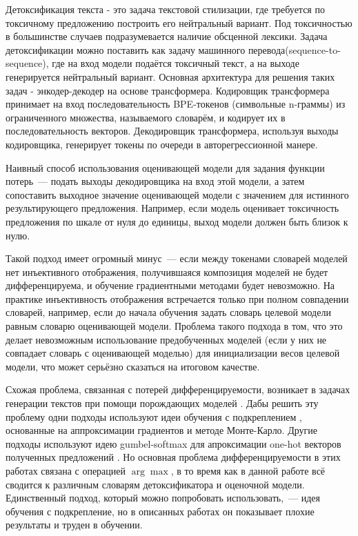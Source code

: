 Детоксификация текста - это задача текстовой стилизации, где требуется по токсичному предложению построить его нейтральный вариант.
Под токсичностью в большинстве случаев подразумевается наличие обсценной лексики.
Задача детоксификации можно поставить как задачу машинного перевода(sequence-to-sequence), где на вход модели подаётся токсичный текст, а на выходе генерируется нейтральный вариант. 
Основная архитектура для решения таких задач - энкодер-декодер на основе трансформера\cite{t5}. 
Кодировщик трансформера принимает на вход последовательность BPE-токенов (символьные n-граммы) из ограниченного множества, называемого словарём, и кодирует их в последовательность векторов. 
Декодировщик трансформера, используя выходы кодировщика, генерирует токены по очереди в авторегрессионной манере.

Наивный способ использования оценивающей модели для задания функции потерь~--- подать выходы декодировщика на вход этой модели, а затем сопоставить выходное значение оценивающей модели с значением для истинного результирующего предложения. 
Например, если модель оценивает токсичность предложения по шкале от нуля до единицы, выход модели должен быть близок к нулю.

Такой подход имеет огромный минус~--- если между токенами словарей моделей нет инъективного отображения, получившаяся композиция моделей не будет дифференцируема, и обучение градиентными методами будет невозможно. 
На практике инъективность отображения встречается только при полном совпадении словарей, например, если до начала обучения задать словарь целевой модели равным словарю оценивающей модели. 
Проблема такого подхода в том, что это делает невозможным использование предобученных моделей (если у них не совпадает словарь с оценивающей моделью) для инициализации весов целевой модели, что может серьёзно сказаться на итоговом качестве.

Схожая проблема, связанная с потерей дифференцируемости, возникает в задачах генерации текстов при помощи порождающих моделей \cite{gan-bert, gan-wo-rl}.
Дабы решить эту проблему одни подходы используют идеи обучения с подкреплением \cite{Yu_Zhang_Wang_Yu_2017}, основанные на аппроксимации градиентов и методе Монте-Карло.
Другие подходы используют идею gumbel-softmax для апроксимации one-hot векторов полученных предложений \cite{kusner2016gans}.
Но основная проблема дифференцируемости в этих работах связана с операцией $\arg\max$, в то время как в данной работе всё сводится к различным словарям детоксификатора и оценочной модели. 
Единственный подход, который можно попробовать использовать,~--- идея обучения с подкрепление, но в описанных работах он показывает плохие результаты и труден в обучении. 

